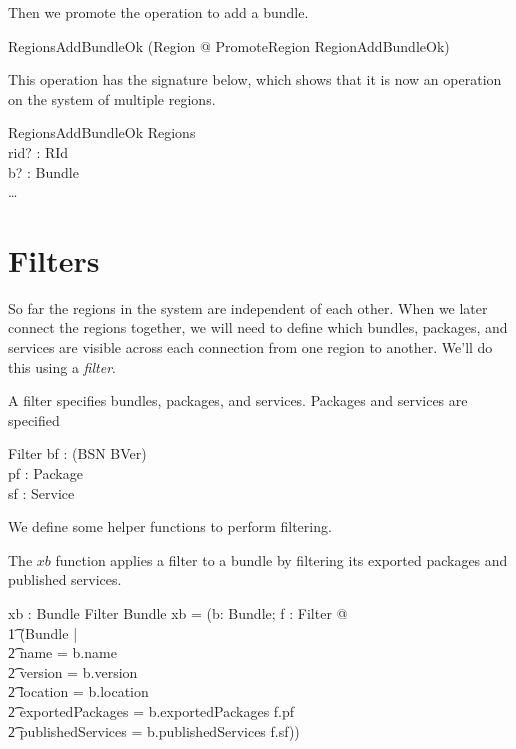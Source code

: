 \documentclass[a4paper,9pt]{article}
\begin{document}
Then we promote the operation to add a bundle.
\begin{zed}
  RegionsAddBundleOk  (\exists \Delta Region @ PromoteRegion \land RegionAddBundleOk) \\
\end{zed}

This operation has the signature below, which shows that it is now an operation on the
system of multiple regions.
\begin{schema}{RegionsAddBundleOk}
  \Delta Regions \\
  rid? : RId \\
  b? : Bundle \\
\where
  \ldots
\end{schema}

\clearpage
\section{Filters}
\label{cha:filters}

So far the regions in the system are independent of each other.
When we later connect the regions together, we will need to define which bundles,
packages, and services are visible across each connection from one region to another.
We'll do this using a \textit{filter}.

A filter specifies bundles, packages, and services. Packages and services are specified
\begin{schema}{Filter}
  bf : \power (BSN \cross BVer) \\
  pf : \power Package \\
  sf : \power Service \\
\end{schema}

We define some helper functions to perform filtering.

The $xb$ function applies a filter to a bundle by filtering its exported packages and published services.
\begin{axdef}
  xb : Bundle \cross Filter \fun Bundle
\where
  xb = (\lambda b: Bundle; f : Filter @ \\
\t1  (\mu Bundle | \\
\t2 name = b.name \land \\
\t2 version = b.version \land \\
\t2 location = b.location \land \\
\t2 exportedPackages = b.exportedPackages \cap f.pf \land \\
\t2 publishedServices = b.publishedServices \cap f.sf))
\end{axdef}
\end{document}
